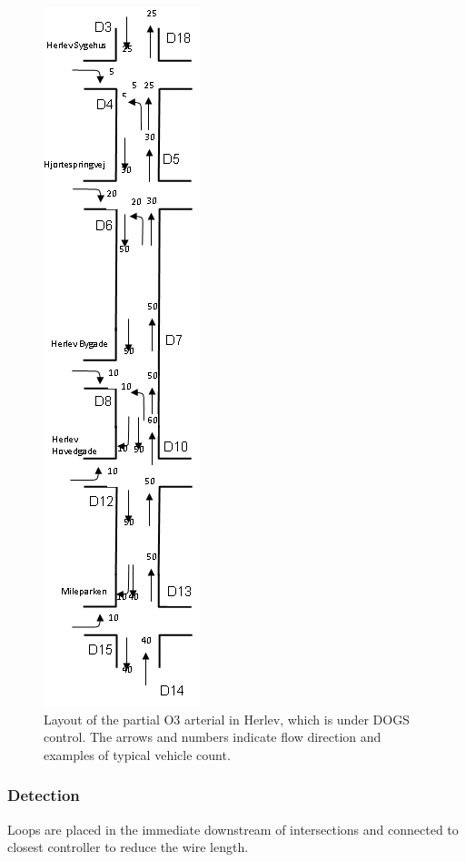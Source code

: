 \begin{figure}[!ht]
\begin{center}
\includegraphics[scale=0.5]{dogs_herlev.png} 
\end{center}
\caption{Layout of the partial O3 arterial in Herlev, which is under DOGS control. The arrows and numbers indicate flow direction and examples of typical vehicle count.}
\label{fig:dogs_herlev}
\end{figure}

\subsubsection*{Detection}
Loops are placed in the immediate downstream of intersections and connected to closest controller to reduce the wire length. 

